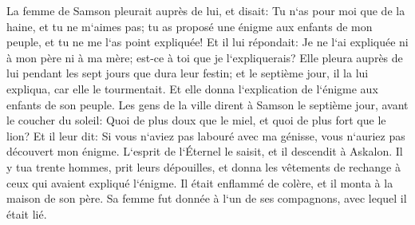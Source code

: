 \verse La femme de Samson pleurait auprès de lui, et disait: Tu n`as pour moi que de la haine, et tu ne m`aimes pas; tu as proposé une énigme aux enfants de mon peuple, et tu ne me l`as point expliquée! Et il lui répondait: Je ne l`ai expliquée ni à mon père ni à ma mère; est-ce à toi que je l`expliquerais? 
\verse Elle pleura auprès de lui pendant les sept jours que dura leur festin; et le septième jour, il la lui expliqua, car elle le tourmentait. Et elle donna l`explication de l`énigme aux enfants de son peuple. 
\verse Les gens de la ville dirent à Samson le septième jour, avant le coucher du soleil: Quoi de plus doux que le miel, et quoi de plus fort que le lion? Et il leur dit: Si vous n`aviez pas labouré avec ma génisse, vous n`auriez pas découvert mon énigme. 
\verse L`esprit de l`Éternel le saisit, et il descendit à Askalon. Il y tua trente hommes, prit leurs dépouilles, et donna les vêtements de rechange à ceux qui avaient expliqué l`énigme. Il était enflammé de colère, et il monta à la maison de son père. 
\verse Sa femme fut donnée à l`un de ses compagnons, avec lequel il était lié. 

